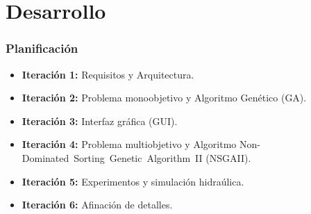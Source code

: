 \documentclass[9pt]{beamer}
\begin{document}
    \section{Desarrollo}


    \begin{frame}
        \frametitle{Planificación}                 
        \begin{itemize}\justifying
            \item \textbf{Iteración 1:} Requisitos y Arquitectura.
            \item \textbf{Iteración 2:} Problema monoobjetivo y Algoritmo Genético (GA).
            \item \textbf{Iteración 3:} Interfaz gráfica (GUI).
            \item \textbf{Iteración 4:} Problema multiobjetivo y Algoritmo Non-Dominated Sorting Genetic Algorithm II (NSGAII).
            \item \textbf{Iteración 5:} Experimentos y simulación hidraúlica.
            \item \textbf{Iteración 6:} Afinación de detalles.
        \end{itemize}
    \end{frame}
\end{document}
